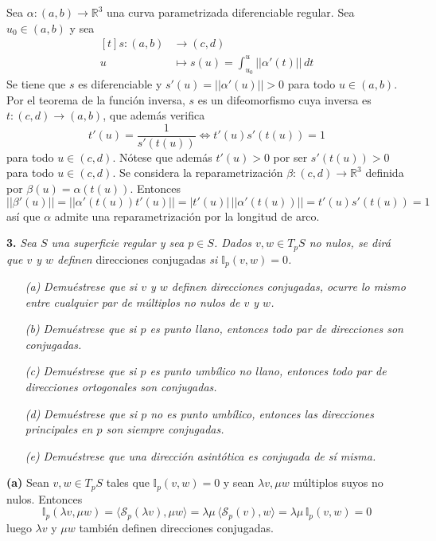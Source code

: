 \documentclass[12pt]{report}
\newcommand{\R}{\mathbb R}
\begin{document}
\vspace{2mm}
Sea $\alpha \colon (a,b) \to \R^3$ una curva parametrizada diferenciable regular. Sea $u_0 \in (a,b)$ y sea
\[
\begin{aligned}[t]
    s \colon (a,b) &\longrightarrow (c,d)  \\
    u &\longmapsto s(u) = \int_{u_0}^u ||\alpha'(t)|| \, dt
\end{aligned}
\]
Se tiene que $s$ es diferenciable y $s'(u) = ||\alpha'(u)|| > 0$ para todo $u \in (a,b)$. Por el teorema de la función inversa, $s$ es un difeomorfismo cuya inversa es $t \colon (c,d) \to (a,b)$, que además verifica
\[t'(u) = \frac{1}{s'(t(u))} \iff t'(u)s'(t(u)) = 1\]
para todo $u \in (c,d)$. Nótese que además $t'(u) > 0$ por ser $s'(t(u)) > 0$ para todo $u \in (c,d)$. Se considera la reparametrización $\beta \colon (c,d) \longrightarrow \R^3$ definida por $\beta(u) = \alpha(t(u))$.
Entonces
\[||\beta'(u)|| = ||\alpha'(t(u))t'(u)|| = |t'(u)| \, ||\alpha'(t(u))|| = t'(u)s'(t(u)) = 1\]
así que $\alpha$ admite una reparametrización por la longitud de arco.
\pagebreak

\vspace{4mm}
\textbf{3. } \textit{Sea $S$ una superficie regular y sea $p \in S$. Dados $v, w \in T_pS$ no nulos, se dirá que $v$ y $w$ definen} direcciones conjugadas \textit{si $\mathbb{I}_p(v,w) = 0$.}
\begin{itemize}
    \item[\textit{(a)}] \textit{Demuéstrese que si $v$ y $w$ definen direcciones conjugadas, ocurre lo mismo entre cualquier par de múltiplos no nulos de $v$ y $w$.}
    \item[\textit{(b)}] \textit{Demuéstrese que si $p$ es punto llano, entonces todo par de direcciones son conjugadas.}
    \item[\textit{(c)}] \textit{Demuéstrese que si $p$ es punto umbílico no llano, entonces todo par de direcciones ortogonales son conjugadas. }
    \item[\textit{(d)}] \textit{Demuéstrese que si $p$ no es punto umbílico, entonces las direcciones principales en $p$ son siempre conjugadas.}
    \item[\textit{(e)}] \textit{Demuéstrese que una dirección asintótica es conjugada de sí misma.}
\end{itemize}

\textbf{(a) } Sean $v,w \in T_pS$ tales que $\mathbb{I}_p(v,w) = 0$ y sean $\lambda v, \mu w$ múltiplos suyos no nulos. Entonces
\[\mathbb{I}_p(\lambda v, \mu w) = \langle \mathcal{S}_p(\lambda v), \mu w \rangle = \lambda \mu \, \langle \mathcal{S}_p(v), w \rangle = \lambda \mu \, \mathbb{I}_p(v,w) = 0\]
luego $\lambda v$ y $\mu w$ también definen direcciones conjugadas.
\end{document}
